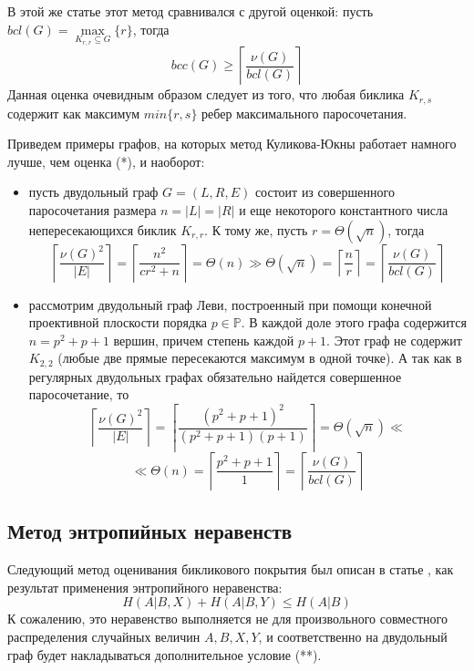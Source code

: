 \documentclass[a4paper]{article}
\begin{document}
В этой же статье \cite{KulikovJukna} этот метод сравнивался с другой оценкой: пусть $bcl(G) = \max\limits_{K_{r,r}\subseteq G}\{r\}$, 
тогда
\[bcc(G) \geq \left\lceil\frac{\nu(G)}{bcl(G)}\right\rceil \tag{*}\]
Данная оценка очевидным образом следует из того, что любая биклика $K_{r, s}$ содержит как максимум 
$min\{r, s\}$ ребер максимального паросочетания.

Приведем примеры графов, на которых метод Куликова-Юкны работает намного лучше, чем оценка (*), и наоборот:

\begin{itemize}
    \item пусть двудольный граф $G = (L, R, E)$ состоит из совершенного паросочетания размера 
    $n = |L| = |R|$ и еще некоторого константного числа непересекающихся биклик $K_{r,r}$. 
    К тому же, пусть $r = \Theta(\sqrt{n})$, тогда $$\left\lceil\frac{\nu(G)^2}{|E|}\right\rceil = 
    \left\lceil\frac{n^2}{cr^2 + n}\right\rceil = \Theta(n) \gg \Theta(\sqrt{n}) = \left\lceil\frac{n}{r}\right\rceil = 
    \left\lceil\frac{\nu(G)}{bcl(G)}\right\rceil$$ 
    \item рассмотрим двудольный граф Леви, построенный при помощи конечной проективной плоскости порядка 
    $p\in \mathbb{P}$. В каждой доле этого графа содержится $n = p^2 + p + 1$ вершин, причем степень 
    каждой $p+1$. Этот граф не содержит $K_{2,2}$ (любые две прямые пересекаются максимум в одной точке). 
    А так как в регулярных двудольных графах обязательно найдется совершенное паросочетание, то 
    $$\left\lceil\frac{\nu(G)^2}{|E|}\right\rceil = \left\lceil\frac{(p^2 + p + 1)^2}{(p^2+p+1)(p+1)}\right\rceil = 
    \Theta(\sqrt{n}) \ll$$ $$\ll \Theta(n) = \left\lceil\frac{p^2 + p + 1}{1}\right\rceil = \left\lceil\frac{\nu(G)}{bcl(G)}\right\rceil$$
\end{itemize}




\subsection{Метод энтропийных неравенств}

Следующий метод оценивания бикликового покрытия был описан в статье \cite{EntropyInequality}, как результат 
применения энтропийного неравенства: $$H(A|B,X) + H(A|B,Y) \leq H(A|B)$$ К сожалению, это неравенство 
выполняется не для произвольного совместного распределения случайных величин $A, B, X, Y$, и соответственно 
на двудольный граф будет накладываться дополнительное условие (**).
\end{document}
